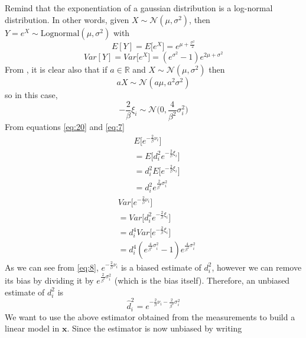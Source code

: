 \documentclass[12pt]{report}
\begin{document}
Remind that the exponentiation of a gaussian distribution is \cite{Beran2011} a log-normal distribution. In other words, given $X\sim \mathcal{N}(\mu,\sigma^2)$, then $Y=e^X\sim \text{Lognormal}(\mu,\sigma^2)$ with
\begin{equation}
    E[Y]=E\big[e^X\big]=e^{\mu+\frac{\sigma^2}{2}}
    \label{eq:20}
\end{equation}
\begin{equation}
    Var[Y]=Var\big[e^X\big]=(e^{\sigma^2}-1)e^{2\mu+\sigma^2}
    \label{eq:7}
\end{equation}
From \cite{alma9926534668905776}, it is clear also that if $a\in \mathbb{R}$ and $X\sim \mathcal{N}(\mu,\sigma^2)$ then
\begin{equation}
aX\sim \mathcal{N}(a\mu,a^2\sigma^2)    
\end{equation}
so in this case, 
\begin{equation}
    -\frac{2}{\beta}\xi_i\sim \mathcal{N}\bigg(0,\frac{4}{\beta^2}\sigma^2_i\bigg)
\end{equation}
From equations \eqref{eq:20} and \eqref{eq:7}
\begin{align}
    &E\bigg[e^{-\frac{2}{\beta}\nu_i}\bigg]\\
    &=E\bigg[d_i^2e^{-\frac{2}{\beta}\xi_i}\bigg]\\
    &=d_i^2E\bigg[e^{-\frac{2}{\beta}\xi_i}\bigg]\\ &=d_i^2e^{\frac{2}{\beta^2}\sigma^2_i}
    \label{eq:8}
\end{align}
\begin{align}
    &Var\bigg[e^{-\frac{2}{\beta}\nu_i}\bigg]\\
    &=Var\bigg[d_i^2e^{-\frac{2}{\beta}\xi_i}\bigg]\\
    &=d_i^4Var\bigg[e^{-\frac{2}{\beta}\xi_i}\bigg]\\
    &=d_i^4(e^{\frac{4}{\beta^2}\sigma_i^2}-1)e^{\frac{4}{\beta^2}\sigma^2_i}
    \label{eq:21}
\end{align}
As we can see from \eqref{eq:8}, $e^{-\frac{2}{\beta}\nu_i}$ is a biased estimate of $d_i^2$, however we can remove its bias by dividing it by $e^{\frac{2}{\beta^2}\sigma^2_i}$ (which is the bias itself). Therefore, an unbiased estimate of $d_i^2$ is 
\begin{equation}
    \hat{d}_i^2=e^{-\frac{2}{\beta}\nu_i-\frac{2}{\beta^2}\sigma^2_i}
    \label{eq:9}
\end{equation}
We want to use the above estimator obtained from the measurements to build a linear model in $\mathbf{x}$. Since the estimator is now unbiased by writing 
\end{document}
